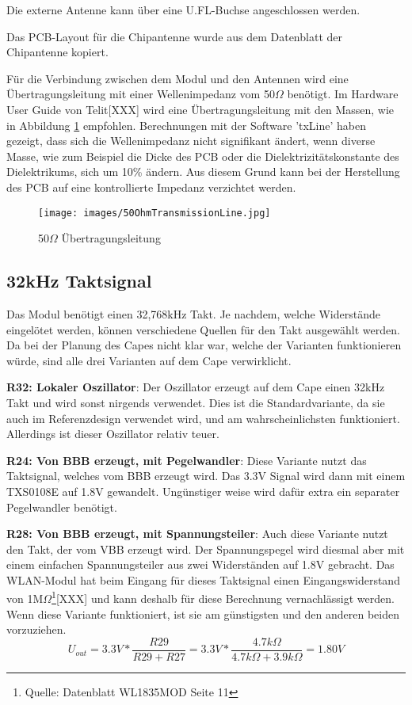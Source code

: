 Die externe Antenne kann über eine U.FL-Buchse angeschlossen werden.

Das PCB-Layout für die Chipantenne wurde aus dem Datenblatt der Chipantenne kopiert.

Für die Verbindung zwischen dem Modul und den Antennen wird eine Übertragungsleitung mit einer Wellenimpedanz vom 50$\Omega$ benötigt. Im Hardware User Guide von Telit[XXX] wird eine Übertragungsleitung mit den Massen, wie in Abbildung \ref{50OhmTransmissionLine} empfohlen. Berechnungen mit der Software 'txLine' haben gezeigt, dass sich die Wellenimpedanz nicht signifikant ändert, wenn diverse Masse, wie zum Beispiel die Dicke des PCB oder die Dielektrizitätskonstante des Dielektrikums, sich um 10\% ändern. Aus diesem Grund kann bei der Herstellung des PCB auf eine kontrollierte Impedanz verzichtet werden.


\begin{figure}[!ht]
\centering
\texttt{[image: images/50OhmTransmissionLine.jpg]}
\caption{50$\Omega$ Übertragungsleitung}
\label{50OhmTransmissionLine}
\end{figure}


\subsection{32kHz Taktsignal}
Das Modul benötigt einen 32,768kHz Takt. Je nachdem, welche Widerstände eingelötet werden, können verschiedene Quellen für den Takt ausgewählt werden. Da bei der Planung des Capes nicht klar war, welche der Varianten funktionieren würde, sind alle drei Varianten auf dem Cape verwirklicht.

\textbf{R32: Lokaler Oszillator}: Der Oszillator erzeugt auf dem Cape einen 32kHz Takt und wird sonst nirgends verwendet. Dies ist die Standardvariante, da sie auch im Referenzdesign verwendet wird, und am wahrscheinlichsten funktioniert. Allerdings ist dieser Oszillator relativ teuer.

\textbf{R24: Von BBB erzeugt, mit Pegelwandler}: Diese Variante nutzt das Taktsignal, welches vom BBB erzeugt wird. Das 3.3V Signal wird dann mit einem TXS0108E auf 1.8V gewandelt. Ungünstiger weise wird dafür extra ein separater Pegelwandler benötigt.

\textbf{R28: Von BBB erzeugt, mit Spannungsteiler}: Auch diese Variante nutzt den Takt, der vom VBB erzeugt wird. Der Spannungspegel wird diesmal aber mit einem einfachen Spannungsteiler aus zwei Widerständen auf 1.8V gebracht. Das WLAN-Modul hat beim Eingang für dieses Taktsignal einen Eingangswiderstand von 1M$\Omega$\footnote{Quelle: Datenblatt WL1835MOD Seite 11}[XXX] und kann deshalb für diese Berechnung vernachlässigt werden. Wenn diese Variante funktioniert, ist sie am günstigsten und den anderen beiden vorzuziehen.
$$U_{out} =  3.3V * \dfrac{R29}{R29+R27} = 3.3V * \dfrac{4.7k\Omega}{4.7k\Omega+3.9k\Omega} = 1.80V$$

